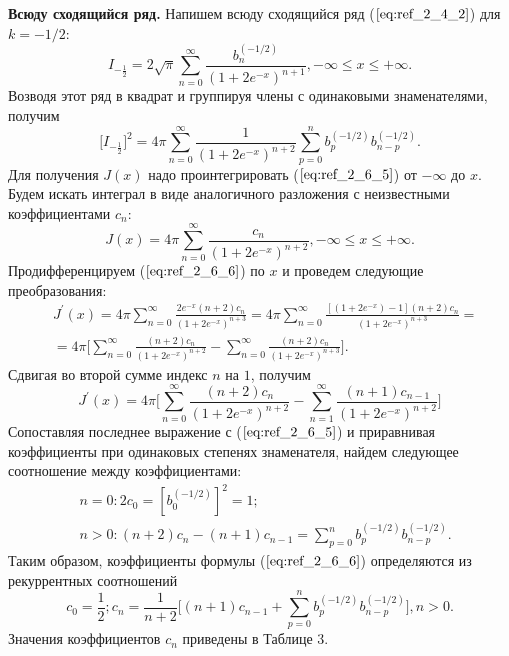 \textbf{Всюду сходящийся ряд.} Напишем всюду сходящийся ряд ($\ref{eq:ref_2_4_2}$) для $k = -1/2$:
\begin{equation}
I_{-\frac{1}{2}} = 2\sqrt{\pi} \sum\limits_{n=0}^{\infty} \frac{b_n^{(-1/2)}}{(1+2e^{-x})^{n+1}}, -\infty \leqslant x \leqslant +\infty.
\label{eq:ref_2_6_4}
\end{equation}
Возводя этот ряд в квадрат и группируя члены с одинаковыми знаменателями, получим
\begin{equation}
\bigg[I_{-\frac{1}{2}} \bigg]^2 = 4\pi \sum\limits_{n=0}^{\infty} \frac{1}{(1+2e^{-x})^{n+2}} \sum\limits_{p=0}^n b_p^{(-1/2)} b_{n-p}^{(-1/2)}.
\label{eq:ref_2_6_5}
\end{equation}
Для получения $J(x)$ надо проинтегрировать ($\ref{eq:ref_2_6_5}$) от $-\infty$ до $x$. Будем искать
интеграл в виде аналогичного разложения с неизвестными коэффициентами $c_n$:
\begin{equation}
J(x)=4\pi \sum_{n=0}^{\infty} \frac{c_n}{(1+2e^{-x})^{n+2}}, -\infty \leqslant x \leqslant +\infty.
\label{eq:ref_2_6_6}
\end{equation}
Продифференцируем ($\ref{eq:ref_2_6_6}$) по $x$ и проведем следующие преобразования:
\begin{equation}
\begin{aligned}
&J^{'}(x) = 4\pi \sum\limits_{n=0}^{\infty} \frac{2e^{-x}(n+2)c_n}{(1+2e^{-x})^{n+3}} = 4\pi \sum\limits_{n=0}^{\infty} \frac{[(1+2e^{-x}) - 1](n+2)c_n}{(1+2e^{-x})^{n+3}} = \\
&= 4\pi \Bigg[ \sum\limits_{n=0}^{\infty} \frac{(n+2)c_n}{(1+2e^{-x})^{n+2}} - \sum\limits_{n=0}^{\infty} \frac{(n+2)c_n}{(1+2e^{-x})^{n+3}} \Bigg].
\end{aligned}
\label{eq:ref_2_6_7}
\end{equation}
Сдвигая во второй сумме индекс $n$ на $1$, получим
\begin{equation}
J^{'}(x) = 4\pi \Bigg[ \sum\limits_{n=0}^{\infty} \frac{(n+2)c_n}{(1+2e^{-x})^{n+2}} - \sum\limits_{n=1}^{\infty} \frac{(n+1)c_{n-1}}{(1+2e^{-x})^{n+2}}\Bigg]
\label{eq:ref_2_6_8}
\end{equation}
Сопоставляя последнее выражение с ($\ref{eq:ref_2_6_5}$) и приравнивая коэффициенты при
одинаковых степенях знаменателя, найдем следующее соотношение между
коэффициентами:
\begin{equation}
\begin{aligned}
&n=0: 2c_0 = [b_0^{(-1/2)}]^2 = 1;\\
&n>0: (n+2)c_n - (n+1)c_{n-1} = \sum\limits_{p=0}^n b_p^{(-1/2)}b_{n-p}^{(-1/2)}.
\end{aligned}
\label{eq:ref_2_6_9}
\end{equation}
Таким образом, коэффициенты формулы ($\ref{eq:ref_2_6_6}$) определяются из рекуррентных соотношений
\begin{equation}
c_0 = \frac{1}{2}; c_n = \frac{1}{n+2} \Bigg[ (n+1)c_{n-1} + \sum\limits_{p=0}^n b_p^{(-1/2)}b_{n-p}^{(-1/2)} \Bigg], n > 0.
\label{eq:ref_2_6_10}
\end{equation}
Значения коэффициентов $c_n$ приведены в Таблице 3.

